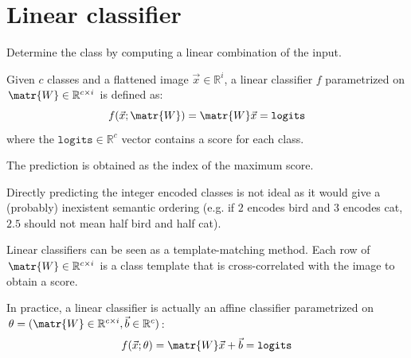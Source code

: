\section{Linear classifier}

Determine the class by computing a linear combination of the input.

Given $c$ classes and a flattened image $\vec{x} \in \mathbb{R}^{i}$, a linear classifier $f$ parametrized on $\matr{W} \in \mathbb{R}^{c \times i}$ is defined as:
\[ f(\vec{x}; \matr{W}) = \matr{W}\vec{x} = \texttt{logits} \]
where the $\texttt{logits} \in \mathbb{R}^{c}$ vector contains a score for each class.

The prediction is obtained as the index of the maximum score.

\begin{remark}
    Directly predicting the integer encoded classes is not ideal as it would give a (probably) inexistent semantic ordering
    (e.g. if $2$ encodes bird and $3$ encodes cat, $2.5$ should not mean half bird and half cat).
\end{remark}

\begin{remark}
    Linear classifiers can be seen as a template-matching method.
    Each row of $\matr{W} \in \mathbb{R}^{c \times i}$ is a class template that is cross-correlated with the image to obtain a score.
\end{remark}

\begin{remark}
    In practice, a linear classifier is actually an affine classifier parametrized on $\theta = (\matr{W} \in \mathbb{R}^{c \times i}, \vec{b} \in \mathbb{R}^{c})$:
    \[ f(\vec{x}; \theta) = \matr{W}\vec{x} + \vec{b} = \texttt{logits} \]
\end{remark}




